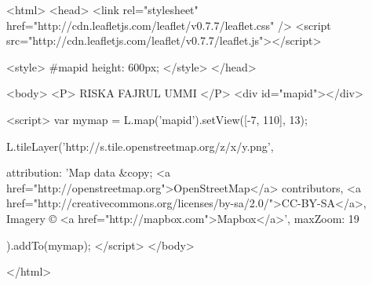<html>
<head>
	 <link rel="stylesheet" href="http://cdn.leafletjs.com/leaflet/v0.7.7/leaflet.css" />
	 <script src="http://cdn.leafletjs.com/leaflet/v0.7.7/leaflet.js"></script>
	 
	 <style>
	 #mapid { height: 600px; }
	 </style>
</head>

<body>
	<P> RISKA FAJRUL UMMI
	</P>
	<div id="mapid"></div> 
	
	<script>
		var mymap = L.map('mapid').setView([-7, 110], 13);
		
		L.tileLayer('http://{s}.tile.openstreetmap.org/{z}/{x}/{y}.png', {
			attribution: 'Map data &copy; <a href="http://openstreetmap.org">OpenStreetMap</a> contributors, <a href="http://creativecommons.org/licenses/by-sa/2.0/">CC-BY-SA</a>, Imagery © <a href="http://mapbox.com">Mapbox</a>',
			maxZoom: 19
    
	}).addTo(mymap);
	</script>
</body>

</html>